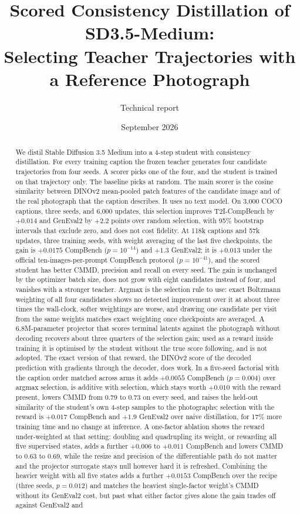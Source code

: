 \documentclass[11pt,a4paper]{article}
\title{\texorpdfstring{\textbf{Scored Consistency Distillation of SD3.5-Medium:\\Selecting Teacher Trajectories with a Reference Photograph}}{Scored Consistency Distillation of SD3.5-Medium: Selecting Teacher Trajectories with a Reference Photograph}}
\author{Technical report}
\date{September 2026}
\begin{document}
\maketitle

\begin{abstract}
We distil Stable Diffusion 3.5 Medium into a 4-step student with consistency distillation. For every training caption the frozen teacher generates four candidate trajectories from four seeds. A scorer picks one of the four, and the student is trained on that trajectory only. The baseline picks at random. The main scorer is the cosine similarity between DINOv2 mean-pooled patch features of the candidate image and of the real photograph that the caption describes. It uses no text model. On 3,000 COCO captions, three seeds, and 6,000 updates, this selection improves T2I-CompBench by $+0.014$ and GenEval2 by $+2.2$ points over random selection, with 95\% bootstrap intervals that exclude zero, and does not cost fidelity. At 118k captions and 57k updates, three training seeds, with weight averaging of the last five checkpoints, the gain is $+0.0175$ CompBench ($p=10^{-14}$) and $+1.3$ GenEval2; it is $+0.013$ under the official ten-images-per-prompt CompBench protocol ($p=10^{-41}$), and the scored student has better CMMD, precision and recall on every seed. The gain is unchanged by the optimizer batch size, does not grow with eight candidates instead of four, and vanishes with a stronger teacher. Argmax is the selection rule to use: exact Boltzmann weighting of all four candidates shows no detected improvement over it at about three times the wall-clock, softer weightings are worse, and drawing one candidate per visit from the same weights matches exact weighting once checkpoints are averaged. A 6.8M-parameter projector that scores terminal latents against the photograph without decoding recovers about three quarters of the selection gain; used as a reward inside training it is optimised by the student without the true score following, and is not adopted. The exact version of that reward, the DINOv2 score of the decoded prediction with gradients through the decoder, does work. In a five-seed factorial with the caption order matched across arms it adds $+0.0055$ CompBench ($p=0.004$) over argmax selection, is additive with selection, which stays worth $+0.010$ with the reward present, lowers CMMD from 0.79 to 0.73 on every seed, and raises the held-out similarity of the student's own 4-step samples to the photographs; selection with the reward is $+0.017$ CompBench and $+1.9$ GenEval2 over naive distillation, for 17\% more training time and no change at inference. A one-factor ablation shows the reward under-weighted at that setting: doubling and quadrupling its weight, or rewarding all five supervised states, adds a further $+0.006$ to $+0.011$ CompBench and lowers CMMD to 0.63 to 0.69, while the resize and precision of the differentiable path do not matter and the projector surrogate stays null however hard it is refreshed. Combining the heavier weight with all five states adds a further $+0.0153$ CompBench over the recipe (three seeds, $p=0.012$) and matches the heaviest single-factor weight's CMMD without its GenEval2 cost, but past what either factor gives alone the gain trades off against GenEval2 and 
\end{abstract}
\end{document}
